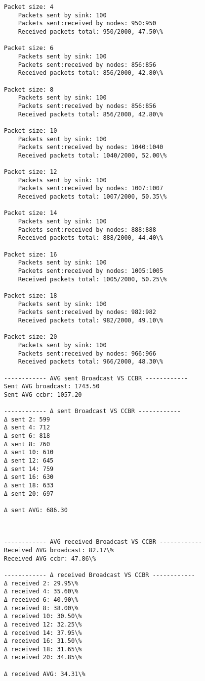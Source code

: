\documentclass[11pt]{article}
\begin{document}
\begin{Verbatim}[commandchars=\\\{\}]
Packet size: 4
	Packets sent by sink: 100
	Packets sent:received by nodes: 950:950
	Received packets total: 950/2000, 47.50\%

Packet size: 6
	Packets sent by sink: 100
	Packets sent:received by nodes: 856:856
	Received packets total: 856/2000, 42.80\%

Packet size: 8
	Packets sent by sink: 100
	Packets sent:received by nodes: 856:856
	Received packets total: 856/2000, 42.80\%

Packet size: 10
	Packets sent by sink: 100
	Packets sent:received by nodes: 1040:1040
	Received packets total: 1040/2000, 52.00\%

Packet size: 12
	Packets sent by sink: 100
	Packets sent:received by nodes: 1007:1007
	Received packets total: 1007/2000, 50.35\%

Packet size: 14
	Packets sent by sink: 100
	Packets sent:received by nodes: 888:888
	Received packets total: 888/2000, 44.40\%

Packet size: 16
	Packets sent by sink: 100
	Packets sent:received by nodes: 1005:1005
	Received packets total: 1005/2000, 50.25\%

Packet size: 18
	Packets sent by sink: 100
	Packets sent:received by nodes: 982:982
	Received packets total: 982/2000, 49.10\%

Packet size: 20
	Packets sent by sink: 100
	Packets sent:received by nodes: 966:966
	Received packets total: 966/2000, 48.30\%

------------ AVG sent Broadcast VS CCBR ------------
Sent AVG broadcast: 1743.50
Sent AVG ccbr: 1057.20

------------ Δ sent Broadcast VS CCBR ------------
Δ sent 2: 599
Δ sent 4: 712
Δ sent 6: 818
Δ sent 8: 760
Δ sent 10: 610
Δ sent 12: 645
Δ sent 14: 759
Δ sent 16: 630
Δ sent 18: 633
Δ sent 20: 697

Δ sent AVG: 686.30

    \end{Verbatim}

    \begin{center}
    \end{center}
    { \hspace*{\fill} \\}
    
    \begin{Verbatim}[commandchars=\\\{\}]
------------ AVG received Broadcast VS CCBR ------------
Received AVG broadcast: 82.17\%
Received AVG ccbr: 47.86\%

------------ Δ received Broadcast VS CCBR ------------
Δ received 2: 29.95\%
Δ received 4: 35.60\%
Δ received 6: 40.90\%
Δ received 8: 38.00\%
Δ received 10: 30.50\%
Δ received 12: 32.25\%
Δ received 14: 37.95\%
Δ received 16: 31.50\%
Δ received 18: 31.65\%
Δ received 20: 34.85\%

Δ received AVG: 34.31\%

    \end{Verbatim}
\end{document}
